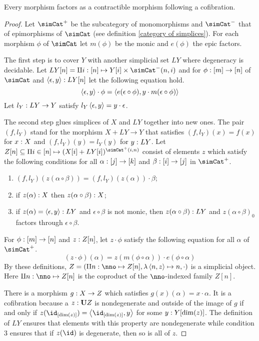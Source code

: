 \documentclass[csh.tex]{subfiles}
\begin{document}
\begin{proposition} Every morphism factors as a contractible morphism following a cofibration. \label{factor1} \end{proposition}

\begin{proof}  
Let $\simCat^+$ be the subcategory of monomorphisms and $\simCat^-$ that of epimorphisms of $\simCat$ (see definition \ref{category of simplices}). For each morphism $\phi$ of $\simCat$ let $m(\phi)$ be the monic and $e(\phi)$ the epic factors.

The first step is to cover $Y$ with another simplicial set $LY$ where degeneracy is decidable.
Let $LY[n] = \coproduct{i\of[n]}{Y[i]\times\simCat^-(n,i)}$ and for $\phi: [m]\to [n]$ of $\simCat$ and $\left\langle \epsilon,y \right\rangle: LY[n]$ let the following equation hold.
\[\left\langle \epsilon,y \right\rangle\cdot \phi=\left\langle e(\epsilon\circ \phi),y\cdot m(\epsilon\circ\phi) \right\rangle\]
Let $l_Y: LY\to Y$ satisfy $l_Y\left\langle \epsilon,y \right\rangle=y\cdot\epsilon$.

The second step glues simplices of $X$ and $LY$ together into new ones.
The pair $(f,l_Y)$ stand for the morphism $X+LY\to Y$ that satisfies $(f,l_Y)(x)=f(x)$ for $x: X$ and $(f,l_Y)(y) = l_Y(y)$ for $y: LY$. Let $Z[n]\subseteq \product{i\in[n]}{(X[i]+LY[i])^{\simCat^+(i,n)}}$ consist of elements $z$ which satisfy the following conditions for all $\alpha: [j]\to [k]$ and $\beta: [i]\to[j]$ in $\simCat^+$.
\begin{enumerate}
\item $(f,l_Y)(z(\alpha\circ\beta)) = (f,l_Y)(z(\alpha))\cdot\beta$;
\item if $z(\alpha): X$ then $z(\alpha\circ\beta): X$;
\item if $z(\alpha)=\left\langle \epsilon,y \right\rangle: LY$ and $\epsilon\circ\beta$ is not monic, then $z(\alpha\circ\beta): LY$ and $z(\alpha\circ\beta)_0$ factors through $\epsilon\circ\beta$.
\end{enumerate}
For $\phi:[m]\to [n]$ and $z: Z[n]$, let $z\cdot\phi$ satisfy the following equation for all $\alpha$ of $\simCat^+$.
\[ (z\cdot\phi)(\alpha) = z(m(\phi\circ\alpha))\cdot e(\phi\circ \alpha) \]
By these definitions, $Z=(\coproduct{n\of\nno}{Z[n]},\function{\tuplet{n,z}}n,\cdot)$ is a simplicial object. Here $\coproduct{n\of\nno}{Z[n]}$ is the coproduct of the $\nno$-indexed family $Z[n]$.

There is a morphism $g: X\to Z$ which satisfies $g(x)(\alpha) = x\cdot\alpha$. It is a cofibration because a $z:\mathbf{U} Z$ is nondegenerate and outside of the image of $g$ if and only if $z(\id_{[\dim(z)]}) = \tuplet{\id_{[\dim(z)]},y}$ for some $y: Y[\dim(z)]$. The definition of $LY$ ensures that elements with this property are nondegenerate while condition 3 ensures that if $z(\id)$ is degenerate, then so is all of $z$.


\end{proof}
\end{document}

